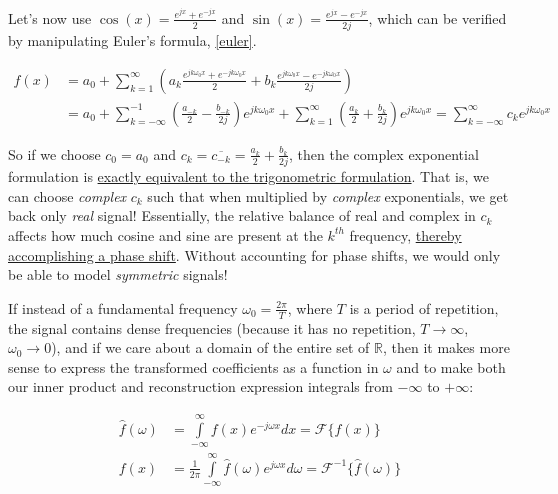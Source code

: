 \documentclass[10pt]{article}
\begin{document}
Let's now use $\cos(x) = \frac{e^{jx} + e^{-jx}}{2}$ and $\sin(x) = \frac{e^{jx} - e^{-jx}}{2j}$, which can be verified by manipulating Euler's formula, \autoref{euler}.\vspace{-2mm}

\begin{align*}
f(x) &= a_0 + \sum_{k=1}^{\infty} (a_k \frac{e^{j k \omega_0 x} + e^{-j k \omega_0 x}}{2} + b_k \frac{e^{j k \omega_0 x} - e^{-j k \omega_0 x}}{2j}) \\
&= a_0 + \sum_{k = -\infty}^{-1} (\frac{a_{-k}}{2} - \frac{b_{-k}}{2j}) e^{j k \omega_0 x} + \sum_{k = 1}^{\infty} (\frac{a_k}{2} + \frac{b_k}{2j}) e^{j k \omega_0 x} = \sum_{k = -\infty}^{\infty} c_k e^{j k \omega_0 x}
\end{align*}

\label{phase}
So if we choose $c_0 = a_0$ and $c_k = \overline{c_{-k}} = \frac{a_k}{2} + \frac{b_k}{2j}$, then the complex exponential formulation is \href{http://lpsa.swarthmore.edu/Fourier/Series/DerFS.html}{exactly equivalent to the trigonometric formulation}\cite{swarthmore}. That is, we can choose \textit{complex} $c_k$ such that when multiplied by \textit{complex} exponentials, we get back only \textit{real} signal! Essentially, the relative balance of real and complex in $c_k$ affects how much cosine and sine are present at the $k^{th}$ frequency, \href{https://dsego.github.io/demystifying-fourier/}{thereby accomplishing a phase shift}\cite{sego}. Without accounting for phase shifts, we would only be able to model \textit{symmetric} signals!

If instead of a fundamental frequency $\omega_0 = \frac{2\pi}{T}$, where $T$ is a period of repetition, the signal contains dense frequencies (because it has no repetition, $T \rightarrow \infty$, $\omega_0 \rightarrow 0$), and if we care about a domain of the entire set of $\mathbb{R}$, then it makes more sense to express the transformed coefficients as a function in $\omega$ and to make both our inner product and reconstruction expression integrals from $-\infty$ to $+\infty$:

\begin{equation}\label{pair}
\begin{aligned}
\hat{f}(\omega) &= \int\limits_{-\infty}^{\infty} f(x) e^{-j \omega x} dx = \mathcal{F}\{f(x)\} \\
f(x) &= \frac{1}{2\pi} \int\limits_{-\infty}^{\infty} \hat{f}(\omega) e^{j \omega x} d \omega = \mathcal{F}^{-1}\{\hat{f}(\omega)\}
\end{aligned}
\end{equation}
\end{document}
